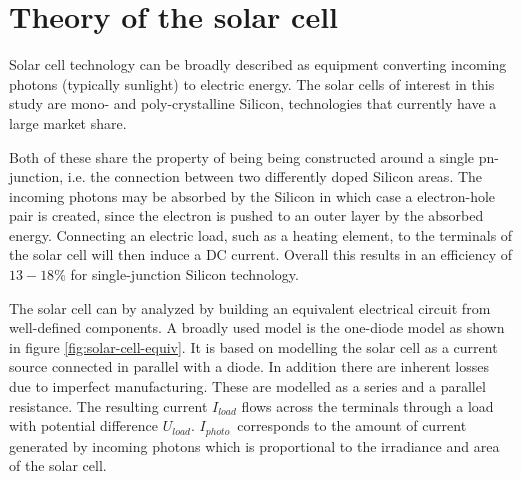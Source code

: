 \section{Theory of the solar cell}
Solar cell technology can be broadly described as equipment converting incoming photons (typically sunlight) to electric energy.
The solar cells of interest in this study are mono- and poly-crystalline Silicon, technologies that currently have a large market share\cite{Zhao2010thesis}.

Both of these share the property of being being constructed around a single pn-junction, i.e. the connection between two differently doped Silicon areas.
The incoming photons may be absorbed by the Silicon in which case a electron-hole pair is created\cite{Zhao2010thesis}, since the electron is pushed to an outer layer by the absorbed energy.
Connecting an electric load, such as a heating element, to the terminals of the solar cell will then induce a DC current.
Overall this results in an efficiency of $13-18\%$ for single-junction Silicon technology\cite{Zhao2010thesis}.

The solar cell can by analyzed by building an equivalent electrical circuit from well-defined components.
A broadly used model is the one-diode model\cite{Walker2001} as shown in figure \ref{fig:solar-cell-equiv}.
It is based on modelling the solar cell as a current source connected in parallel with a diode.
In addition there are inherent losses due to imperfect manufacturing.
These are modelled as a series and a parallel resistance.
The resulting current $I_{load}$ flows across the terminals through a load with potential difference $U_{load}$.
$I_{photo}$ corresponds to the amount of current generated by incoming photons which is proportional to the irradiance and area of the solar cell.

